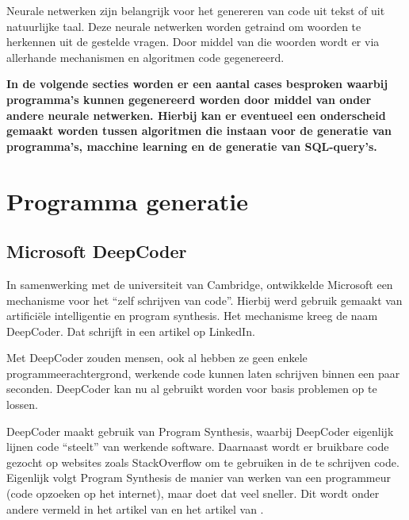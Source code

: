 Neurale netwerken zijn belangrijk voor het genereren van code uit tekst of uit natuurlijke taal. Deze neurale netwerken worden getraind om woorden te herkennen uit de gestelde vragen. Door middel van die woorden wordt er via allerhande mechanismen en algoritmen code gegenereerd.

\textbf{In de volgende secties worden er een aantal cases besproken waarbij programma's kunnen gegenereerd worden door middel van onder andere neurale netwerken. Hierbij kan er eventueel een onderscheid gemaakt worden tussen algoritmen die instaan voor de generatie van programma's, macchine learning en de generatie van SQL-query's.}

\section{Programma generatie}

\subsection{Microsoft DeepCoder}

In samenwerking met de universiteit van Cambridge, ontwikkelde Microsoft een mechanisme voor het “zelf schrijven van code”. Hierbij werd gebruik gemaakt van artificiële intelligentie en program synthesis. Het mechanisme kreeg de naam DeepCoder. Dat schrijft \textcite{DeepCoder} in een artikel op LinkedIn.

Met DeepCoder zouden mensen, ook al hebben ze geen enkele programmeerachtergrond, werkende code kunnen laten schrijven binnen een paar seconden. DeepCoder kan nu al gebruikt worden voor basis problemen op te lossen.

DeepCoder maakt gebruik van Program Synthesis, waarbij DeepCoder eigenlijk lijnen code “steelt” van werkende software. Daarnaast wordt er bruikbare code gezocht op websites zoals StackOverflow om te gebruiken in de te schrijven code. Eigenlijk volgt Program Synthesis de manier van werken van een programmeur (code opzoeken op het internet), maar doet dat veel sneller. Dit wordt onder andere vermeld in het artikel van \textcite{techcrunch} en het artikel van \textcite{NewScientist}.

